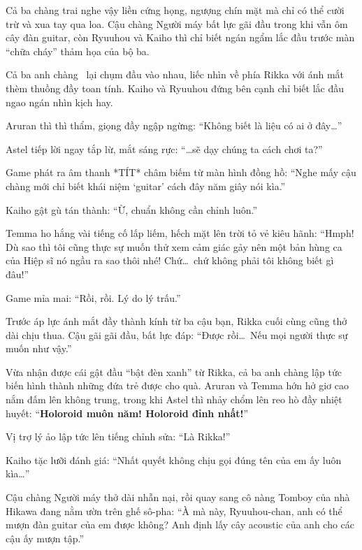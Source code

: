\documentclass[../main.tex]{subfiles}
\begin{document}
Cả ba chàng trai nghe vậy liền cứng họng, ngượng chín mặt mà chỉ có thể cười trừ và xua tay qua loa. Cậu chàng Người máy bất lực gãi đầu trong khi vẫn ôm cây đàn guitar, còn Ryuuhou và Kaiho thì chỉ biết ngán ngẩm lắc đầu trước màn ``chữa cháy'' thảm họa của bộ ba.

\ct

Cả ba anh chàng \hls\ lại chụm đầu vào nhau, liếc nhìn về phía Rikka với ánh mắt thèm thuồng đầy toan tính. Kaiho và Ryuuhou đứng bên cạnh chỉ biết lắc đầu ngao ngán nhìn kịch hay.


Aruran thì thì thẩm, giọng đầy ngập ngừng: ``Không biết là liệu có ai ở đây\dots''

Astel tiếp lời ngay tắp lừ, mắt sáng rực: ``\dots sẽ dạy chúng ta cách chơi ta?''

Game phát ra âm thanh *TÍT* châm biếm từ màn hình đồng hồ: ``Nghe mấy cậu chàng mới chỉ biết khái niệm `guitar' cách đây năm giây nói kìa.''

Kaiho gật gù tán thành: ``Ừ, chuẩn không cần chỉnh luôn.''

Temma ho hắng vài tiếng cố lấp liếm, hếch mặt lên trời tỏ vẻ kiêu hãnh: ``Hmph! Dù sao thì tôi cũng thực sự muốn thử xem cảm giác gảy nên một bản hùng ca của Hiệp sĩ nó ngầu ra sao thôi nhé! Chứ\dots\ chứ không phải tôi không biết gì đâu!''

Game mỉa mai: ``Rồi, rồi. Lý do lý trấu.''

Trước áp lực ánh mắt đầy thành kính từ ba cậu bạn, Rikka cuối cùng cũng thở dài chịu thua. Cậu gãi gãi đầu, bất lực đáp: ``Được rồi\dots\ Nếu mọi người thực sự muốn như vậy.''

Vừa nhận được cái gật đầu ``bật đèn xanh'' từ Rikka, cả ba anh chàng lập tức biến hình thành những đứa trẻ được cho quà. Aruran và Temma hớn hở giơ cao nắm đấm lên không trung, trong khi Astel thì nhảy chổm lên reo hò đầy nhiệt huyết: ``\textbf{Holoroid muôn năm! Holoroid đỉnh nhất!}''


Vị trợ lý ảo lập tức lên tiếng chỉnh sửa: ``Là Rikka!''

Kaiho tặc lưỡi đánh giá: ``Nhất quyết không chịu gọi đúng tên của em ấy luôn kìa\dots''

Cậu chàng Người máy thở dài nhẫn nại, rồi quay sang cô nàng Tomboy của nhà Hikawa đang nằm ườn trên ghế sô-pha: ``À mà này, Ryuuhou-chan, anh có thể mượn đàn guitar của em được không? Anh định lấy cây acoustic của anh cho các cậu ấy mượn tập.''
\end{document}
